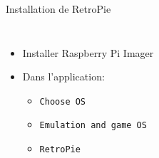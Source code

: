 \documentclass[aspectratio=169,xcolor=dvipsnames]{beamer}
\begin{document}
\begin{frame}{Installation de RetroPie}
    \begin{columns}[c] %

        \begin{itemize}
            \item Installer Raspberry Pi Imager
            \item Dans l'application:
            \begin{itemize}
                \item \texttt{Choose OS}
                \item \texttt{Emulation and game OS}
                \item \texttt{RetroPie}
            \end{itemize}
        \end{itemize}

    \end{columns}
\end{frame}
\end{document}
